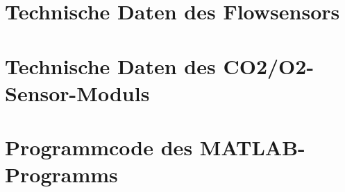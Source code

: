 \chapter{Technische Daten des Flowsensors}


\chapter{Technische Daten des \acrshort{CO2}/\acrshort{O2}-Sensor-Moduls}


\chapter{Programmcode des MATLAB-Programms}



%